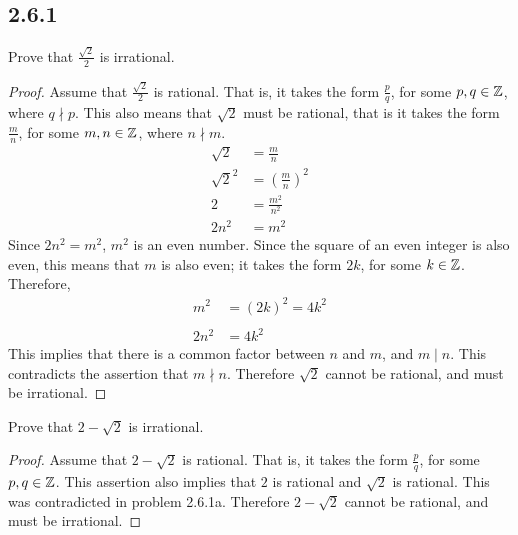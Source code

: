 





\subsection*{2.6.1}
\begin{enumerate}
   Prove that $\frac{\sqrt{2}}{2}$ is irrational.
  \begin{proof}
    Assume that $\frac{\sqrt{2}}{2}$ is rational. That is, it takes the form $\frac{p}{q}$, for some $p,q \in \mathbb{Z}$, where $q \nmid p$. This also means that $\sqrt{2}$ must be rational, that is it takes the form $\frac{m}{n}$, for some $m,n \in \mathbb{Z}$, where $n \nmid m$.
    \begin{align*}
      \sqrt{2}   & = \frac{m}{n}     \\
      \sqrt{2}^2 & = (\frac{m}{n})^2 \\
      2          & = \frac{m^2}{n^2} \\
      2n^2       & = m^2
    \end{align*}
    Since $2n^2 = m^2$, $m^2$ is an even number. Since the square of an even integer is also even, this means that $m$ is also even; it takes the form $2k$, for some $k \in \mathbb{Z}$. Therefore,
    \begin{align*}
      m^2  & = (2k)^2 = 4k^2 \\ \\
      2n^2 & = 4k^2
    \end{align*}
    This implies that there is a common factor between $n$ and $m$, and $m \mid n$. This contradicts the assertion that $m \nmid n$. Therefore $\sqrt{2}$ cannot be rational, and must be irrational.
  \end{proof}
   Prove that $2-\sqrt{2}$ is irrational.
  \begin{proof}
    Assume that $2 - \sqrt{2}$ is rational. That is, it takes the form $\frac{p}{q}$, for some $p,q \in \mathbb{Z}$. This assertion also implies that $2$ is rational and $\sqrt{2}$ is rational. This was contradicted in problem 2.6.1a. Therefore $2 - \sqrt{2}$ cannot be rational, and must be irrational.
  \end{proof}
\end{enumerate}


